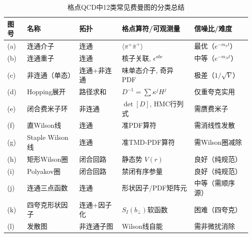 \documentclass[12pt,a4paper]{ctexart}
\begin{document}
\begin{table}[H]
\centering
\caption{格点QCD中12类常见费曼图的分类总结}
\label{tab:diagram_summary}
\small
\begin{tabular}{p{0.8cm}p{2.2cm}p{1.8cm}p{3.2cm}p{3cm}}
\toprule
\textbf{图号} & \textbf{名称} & \textbf{拓扑} & \textbf{格点算符/可观测量} & \textbf{信噪比/难度} \\
\midrule
(a) & 连通介子 & 连通 & $\langle\pi^+ \bar\pi^+\rangle$ & 最优（$e^{-m_\pi t}$）\\
(b) & 连通重子 & 连通 & 核子关联, $\epsilon^{abc}$ & 中等（$e^{-m_N t}$）\\
(c) & 非连通（单态） & 连通+非连通 & 味单态介子, 奇异PDF & 极差（$1/\sqrt{V}$）\\
(d) & Hopping展开 & 路径求和 & $D^{-1}=\sum\kappa^j H^j$ & 仅重夸克实用 \\
(e) & 闭合费米子环 & 非连通 & $\det[D]$, HMC行列式 & 需赝费米子 \\
(f) & 直Wilson线 & 连通 & 准PDF算符 & 需消线性发散 \\
(g) & Staple Wilson线 & 连通 & 准TMD-PDF算符 & 需Wilson圈减除 \\
(h) & 矩形Wilson圈 & 闭合回路 & 静态势 $V(r)$ & 良好（纯规范）\\
(i) & Polyakov圈 & 闭合回路 & 禁闭有序参量 & 良好（纯规范）\\
(j) & 连通三点函数 & 连通 & 形状因子/PDF矩阵元 & 中等（需顺序源）\\
(k) & 四夸克形状因子 & 连通+因子化 & $S_I(b_\perp)$软函数 & 困难（四夸克）\\
(l) & 发散图 & 非连通子图 & Wilson线自能 & 需非微扰消除 \\
\bottomrule
\end{tabular}
\end{table}
\end{document}
